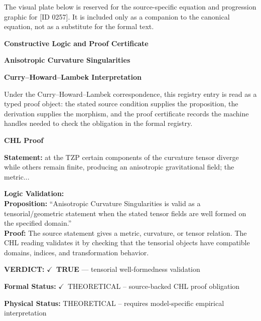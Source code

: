 \begingroup\footnotesize\sloppy
The visual plate below is reserved for the source-specific equation and progression graphic for [ID 0257]. It is included only as a companion to the canonical equation, not as a substitute for the formal text.
\par\endgroup
\ifTZPDarkEdition
{}
\fi

\clearpage
\begingroup\tzpsupportsetup
\noindent\textbf{\fontsize{10.8pt}{12.8pt}\selectfont [ID 0257] Constructive Logic and Proof Certificate}\par
\noindent\textbf{\fontsize{10pt}{12pt}\selectfont Anisotropic Curvature Singularities}\par
\vspace{0.45em}
\begingroup
\footnotesize
\setlength{\parskip}{0.22em}
\setlength{\parindent}{0pt}
\noindent\textbf{Curry--Howard--Lambek Interpretation}\par
Under the Curry--Howard--Lambek correspondence, this registry entry is read as a typed proof
object: the stated source condition supplies the proposition, the derivation supplies the
morphism, and the proof certificate records the machine handles needed to check the obligation
in the formal registry.

\vspace{0.45em}
\noindent\textbf{CHL Proof}\par
\textbf{Statement:} at the TZP certain components of the curvature tensor diverge while others remain
finite, producing an anisotropic gravitational field; the metric...

\textbf{Logic Validation:}\\
\textbf{Proposition:} ``Anisotropic Curvature Singularities is valid as a tensorial/geometric statement when the
stated tensor fields are well formed on the specified domain.''\\
\textbf{Proof:} The source statement gives a metric, curvature, or tensor relation. The CHL reading
validates it by checking that the tensorial objects have compatible domains, indices,
and transformation behavior.

\textbf{VERDICT:} \ensuremath{\checkmark}\ \textbf{TRUE} --- tensorial well-formedness validation

\textbf{Formal Status:} \ensuremath{\checkmark}\ THEORETICAL -- source-backed CHL proof obligation

\textbf{Physical Status:} THEORETICAL -- requires model-specific empirical interpretation
\par\vspace{0.45em}
\par
\ifTZPDarkEdition
{}
\fi
\endgroup
\endgroup
